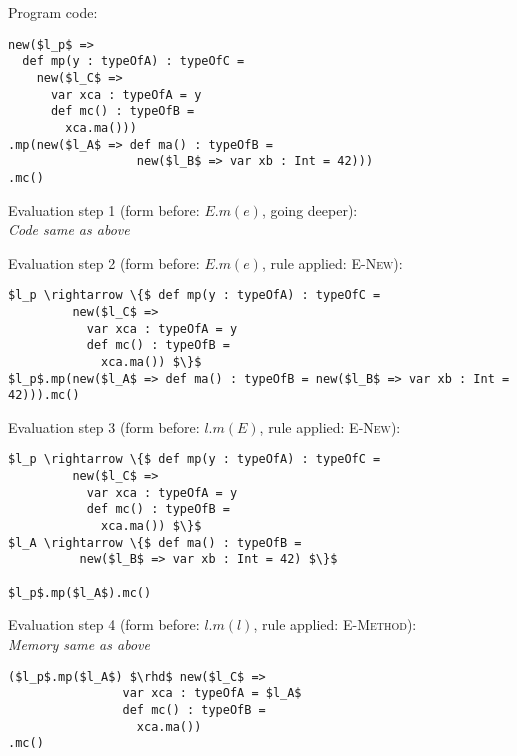 \documentclass{llncs}
\begin{document}
\noindent Program code:
\vspace{-6pt}
\begin{lstlisting}[xleftmargin=20pt]
new($l_p$ =>
  def mp(y : typeOfA) : typeOfC =
    new($l_C$ =>
      var xca : typeOfA = y
      def mc() : typeOfB =
        xca.ma()))
.mp(new($l_A$ => def ma() : typeOfB =
                  new($l_B$ => var xb : Int = 42)))
.mc()
\end{lstlisting}

\vspace{12pt}
\noindent Evaluation step 1 (form before: $E.m(e)$, going deeper):\\
\indent\textit{Code same as above}

\vspace{12pt}
\noindent Evaluation step 2 (form before: $E.m(e)$, rule applied: \textsc{E-New}):
\vspace{-6pt}
\begin{lstlisting}[xleftmargin=20pt]
$l_p \rightarrow \{$ def mp(y : typeOfA) : typeOfC =
         new($l_C$ =>
           var xca : typeOfA = y
           def mc() : typeOfB =
             xca.ma()) $\}$
$l_p$.mp(new($l_A$ => def ma() : typeOfB = new($l_B$ => var xb : Int = 42))).mc()
\end{lstlisting}

\vspace{12pt}
\noindent Evaluation step 3 (form before: $l.m(E)$, rule applied: \textsc{E-New}):
\vspace{-6pt}
\begin{lstlisting}[xleftmargin=20pt]
$l_p \rightarrow \{$ def mp(y : typeOfA) : typeOfC =
         new($l_C$ =>
           var xca : typeOfA = y
           def mc() : typeOfB =
             xca.ma()) $\}$
$l_A \rightarrow \{$ def ma() : typeOfB =
          new($l_B$ => var xb : Int = 42) $\}$

$l_p$.mp($l_A$).mc()
\end{lstlisting}

\vspace{12pt}
\noindent Evaluation step 4 (form before: $l.m(l)$, rule applied: \textsc{E-Method}):\\
\vspace{-6pt}
\indent\textit{Memory same as above}\\
\vspace{-6pt}
\begin{lstlisting}[xleftmargin=20pt]
($l_p$.mp($l_A$) $\rhd$ new($l_C$ =>
                var xca : typeOfA = $l_A$
                def mc() : typeOfB =
                  xca.ma())
.mc()
\end{lstlisting}
\end{document}
